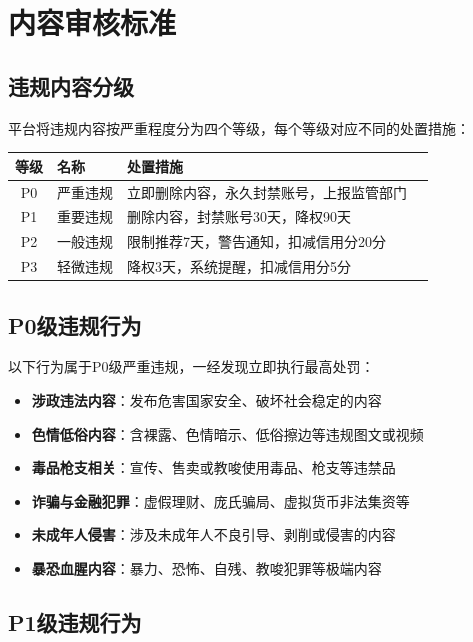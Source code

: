 \documentclass[a4paper,12pt]{article}
\begin{document}
\section{内容审核标准}

\subsection{违规内容分级}

平台将违规内容按严重程度分为四个等级，每个等级对应不同的处置措施：

\begin{table}[h]
\centering
\begin{tabular}{cllp{5cm}}
\toprule
\textbf{等级} & \textbf{名称} & \textbf{处置措施} \\
\midrule
P0 & 严重违规 & 立即删除内容，永久封禁账号，上报监管部门 \\
P1 & 重要违规 & 删除内容，封禁账号30天，降权90天 \\
P2 & 一般违规 & 限制推荐7天，警告通知，扣减信用分20分 \\
P3 & 轻微违规 & 降权3天，系统提醒，扣减信用分5分 \\
\bottomrule
\end{tabular}
\end{table}

\subsection{P0级违规行为}

以下行为属于P0级严重违规，一经发现立即执行最高处罚：

\begin{itemize}[noitemsep]
  \item \textbf{涉政违法内容}：发布危害国家安全、破坏社会稳定的内容
  \item \textbf{色情低俗内容}：含裸露、色情暗示、低俗擦边等违规图文或视频
  \item \textbf{毒品枪支相关}：宣传、售卖或教唆使用毒品、枪支等违禁品
  \item \textbf{诈骗与金融犯罪}：虚假理财、庞氏骗局、虚拟货币非法集资等
  \item \textbf{未成年人侵害}：涉及未成年人不良引导、剥削或侵害的内容
  \item \textbf{暴恐血腥内容}：暴力、恐怖、自残、教唆犯罪等极端内容
\end{itemize}

\subsection{P1级违规行为}
\end{document}
